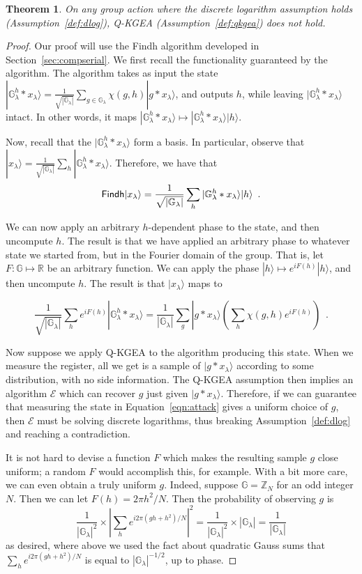 \documentclass{article}\usepackage[a4paper,margin=20mm]{geometry}
\newtheorem{theorem}{Theorem}\newtheorem{lemma}[theorem]{Lemma}\newtheorem{proposition}[theorem]{Proposition}\newtheorem{corollary}[theorem]{Corollary}\newtheorem{definition}[theorem]{Definition}\newtheorem{claim}[theorem]{Claim}\newtheorem{remark}[theorem]{Remark}\newtheorem{observation}[theorem]{Observation}\newtheorem{conjecture}[theorem]{Conjecture}\newtheorem{example}[theorem]{Example}
\numberwithin{theorem}{section}
\numberwithin{equation}{section}
\newcommand{\Z}{\mathbb{Z}}
\newcommand{\R}{\mathbb{R}}
\newcommand{\G}{\mathbb{G}}
\newcommand{\Es}{{\mathcal{E}}}
\begin{document}
\begin{theorem}\label{thm:kgeaattack} On any group action where the discrete logarithm assumption holds (Assumption~\ref{def:dlog}), Q-KGEA (Assumption~\ref{def:qkgea}) does not hold.
\end{theorem}
\begin{proof}Our proof will use the {\sf Findh} algorithm developed in Section~\ref{sec:compserial}. We first recall the functionality guaranteed by the algorithm. The algorithm takes as input the state $|\G_\lambda^h*x_\lambda\rangle=\frac{1}{\sqrt{|\G_\lambda|}}\sum_{g\in\G_\lambda}\chi(g,h)|g*x_\lambda\rangle$, and outputs $h$, while leaving $|\G_\lambda^h*x_\lambda\rangle$ intact. In other words, it maps $|\G_\lambda^h*x_\lambda\rangle\mapsto |\G_\lambda^h*x_\lambda\rangle|h\rangle$.
	
	Now, recall that the $|\G_\lambda^h*x_\lambda\rangle$ form a basis. In particular, observe that $|x_\lambda\rangle=\frac{1}{\sqrt{|\G_\lambda|}}\sum_h|\G_\lambda^h*x_\lambda\rangle$. Therefore, we have that
	\[{\sf Findh}|x_\lambda\rangle=\frac{1}{\sqrt{|\G_\lambda|}}\sum_h|\G_\lambda^h*x_\lambda\rangle|h\rangle\enspace .\]
	
	We can now apply an arbitrary $h$-dependent phase to the state, and then uncompute $h$. The result is that we have applied an arbitrary phase to whatever state we started from, but in the Fourier domain of the group. That is, let $F:\G\mapsto\R$ be an arbitrary function. We can apply the phase $|h\rangle\mapsto e^{iF(h)}|h\rangle$, and then uncompute $h$. The result is that $|x_\lambda\rangle$ maps to
	
	\begin{equation}\label{eqn:attack}\frac{1}{\sqrt{|\G_\lambda|}}\sum_h e^{iF(h)}|\G_\lambda^h*x_\lambda\rangle=\frac{1}{|\G_\lambda|}\sum_{g}|g*x_\lambda\rangle\left(\sum_h\chi(g,h)e^{iF(h)}\right)\enspace .\end{equation}
	
	Now suppose we apply Q-KGEA to the algorithm producing this state. When we measure the register, all we get is a sample of $|g*x_\lambda\rangle$ according to some distribution, with no side information. The Q-KGEA assumption then implies an algorithm $\Es$ which can recover $g$ just given $|g*x_\lambda\rangle$. Therefore, if we can guarantee that measuring the state in Equation~\ref{eqn:attack} gives a uniform choice of $g$, then $\Es$ must be solving discrete logarithms, thus breaking Assumption~\ref{def:dlog} and reaching a contradiction.
	
	It is not hard to devise a function $F$ which makes the resulting sample $g$ close uniform; a random $F$ would accomplish this, for example. With a bit more care, we can even obtain a truly uniform $g$. Indeed, suppose $\G=\Z_N$ for an odd integer $N$. Then we can let $F(h)=2\pi h^2/N$. Then the probability of observing $g$ is 
	\[\frac{1}{|\G_\lambda|^2}\times \left|\sum_he^{i2\pi (gh+h^2)/N}\right|^2=\frac{1}{|\G_\lambda|^2}\times |\G_\lambda|=\frac{1}{|\G_\lambda|}\]
	as desired, where above we used the fact about quadratic Gauss sums that $\sum_he^{i2\pi (gh+h^2)/N}$ is equal to $|\G_\lambda|^{-1/2}$, up to phase.
\end{proof}
\end{document}

